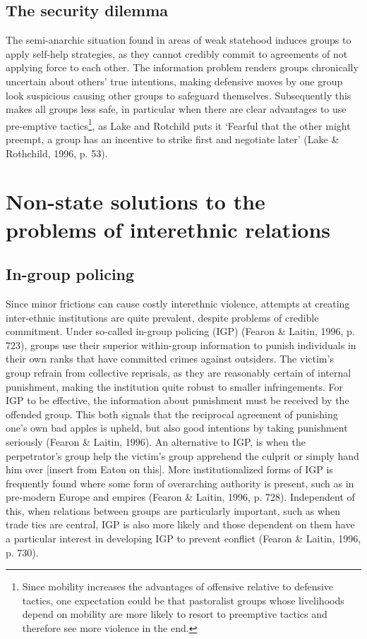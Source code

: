 \documentclass[12pt]{article}
\begin{document}
\subsection{The security dilemma}

The semi-anarchic situation found in areas of weak statehood induces groups to
apply self-help strategies, as they cannot credibly commit to agreements of not
applying force to each other. The information problem renders groups chronically
uncertain about others’ true intentions, making defensive moves by one group
look suspicious causing other groups to safeguard themselves. Subsequently this
makes all groups less safe, in particular when there are clear advantages to use
pre-emptive tactics\footnote{Since mobility increases the advantages of
	offensive relative to defensive tactics, one expectation could be that
	pastoralist groups whose livelihoods depend on mobility are more likely
	to resort to preemptive tactics and therefore see more violence in the
	end.}, as Lake and Rotchild puts it ‘Fearful that the other might
preempt, a group has an incentive to strike first and negotiate later’ (Lake \&
Rothchild, 1996, p. 53).

\section{Non-state solutions to the problems of interethnic relations}

\subsection{In-group policing}

Since minor frictions can cause costly interethnic violence, attempts at
creating inter-ethnic institutions are quite prevalent, despite problems of
credible commitment. Under so-called in-group policing (IGP) (Fearon \& Laitin,
1996, p. 723), groups use their superior within-group information to punish
individuals in their own ranks that have committed crimes against outsiders. The
victim’s group refrain from collective reprisals, as they are reasonably certain
of internal punishment, making the institution quite robust to smaller
infringements. For IGP to be effective, the information about punishment must be
received by the offended group. This both signals that the reciprocal agreement
of punishing one’s own bad apples is upheld, but also good intentions by taking
punishment seriously (Fearon \& Laitin, 1996). An alternative to IGP, is when the
perpetrator’s group help the victim’s group apprehend the culprit or simply hand
him over [insert from Eaton on this]. More institutionalized forms of IGP is
frequently found where some form of overarching authority is present, such as in
pre-modern Europe and empires (Fearon \& Laitin, 1996, p. 728). Independent of
this, when relations between groups are particularly important, such as when
trade ties are central, IGP is also more likely and those dependent on them have
a particular interest in developing IGP to prevent conflict (Fearon \& Laitin,
1996, p. 730).
\end{document}
